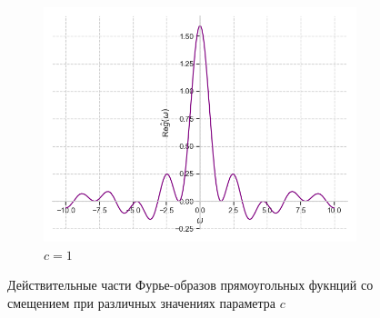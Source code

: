 \documentclass[a4paper, 16pt]{article}
\begin{document}
\begin{figure}[htbp]
\begin{subfigure}{0.3\textwidth}
            \centering
            \includegraphics[width=\linewidth]{sh_1_re_rectf_int12.png}
            \caption{$c=1$}
            \label{fig:reshrectf_3}
        \end{subfigure}
        \caption{Действительные части Фурье-образов прямоугольных фукнций со смещением при различных значениях параметра $c$}
        \label{fig:reshrectfs}
    \end{figure}
\end{document}

